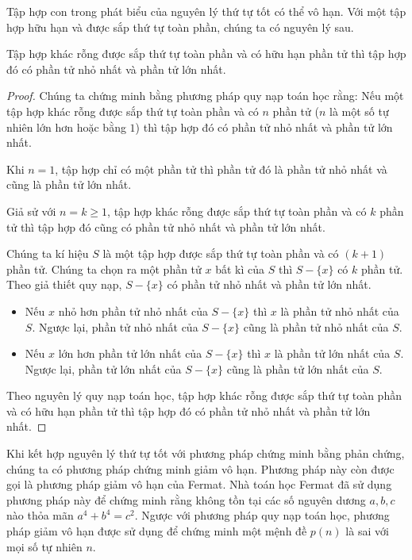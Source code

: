 Tập hợp con trong phát biểu của nguyên lý thứ tự tốt có thể vô hạn. Với một tập hợp hữu hạn và được sắp thứ tự toàn phần, chúng ta có nguyên lý sau.
\begin{theorem}
	Tập hợp khác rỗng được sắp thứ tự toàn phần và có hữu hạn phần tử thì tập hợp đó có phần tử nhỏ nhất và phần tử lớn nhất.
\end{theorem}

\begin{proof}
	Chúng ta chứng minh bằng phương pháp quy nạp toán học rằng: Nếu một tập hợp khác rỗng được sắp thứ tự toàn phần và có $n$ phần tử ($n$ là một số tự nhiên lớn hơn hoặc bằng $1$) thì tập hợp đó có phần tử nhỏ nhất và phần tử lớn nhất.

	Khi $n = 1$, tập hợp chỉ có một phần tử thì phần tử đó là phần tử nhỏ nhất và cũng là phần tử lớn nhất.

	Giả sử với $n = k\geq 1$, tập hợp khác rỗng được sắp thứ tự toàn phần và có $k$ phần tử thì tập hợp đó cũng có phần tử nhỏ nhất và phần tử lớn nhất.

	Chúng ta kí hiệu $S$ là một tập hợp được sắp thứ tự toàn phần và có $(k+1)$ phần tử. Chúng ta chọn ra một phần tử $x$ bất kì của $S$ thì $S - \{x\}$ có $k$ phần tử. Theo giả thiết quy nạp, $S - \{x\}$ có phần tử nhỏ nhất và phần tử lớn nhất.
	\begin{itemize}
		\item Nếu $x$ nhỏ hơn phần tử nhỏ nhất của $S - \{x\}$ thì $x$ là phần tử nhỏ nhất của $S$. Ngược lại, phần tử nhỏ nhất của $S - \{x\}$ cũng là phần tử nhỏ nhất của $S$.
		\item Nếu $x$ lớn hơn phần tử lớn nhất của $S - \{x\}$ thì $x$ là phần tử lớn nhất của $S$. Ngược lại, phần tử lớn nhất của $S - \{x\}$ cũng là phần tử lớn nhất của $S$.
	\end{itemize}

	Theo nguyên lý quy nạp toán học, tập hợp khác rỗng được sắp thứ tự toàn phần và có hữu hạn phần tử thì tập hợp đó có phần tử nhỏ nhất và phần tử lớn nhất.
\end{proof}

Khi kết hợp nguyên lý thứ tự tốt với phương pháp chứng minh bằng phản chứng, chúng ta có phương pháp chứng minh giảm vô hạn. Phương pháp này còn được gọi là phương pháp giảm vô hạn của Fermat. Nhà toán học Fermat đã sử dụng phương pháp này để chứng minh rằng không tồn tại các số nguyên dương $a, b, c$ nào thỏa mãn $a^{4} + b^{4} = c^{2}$. Ngược với phương pháp quy nạp toán học, phương pháp giảm vô hạn được sử dụng để chứng minh một mệnh đề $p(n)$ là sai với mọi số tự nhiên $n$.

